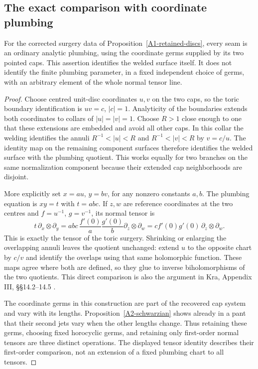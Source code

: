 \subsection{The exact comparison with coordinate plumbing}

\begin{proposition}\label{A1-welding-plumbing}
For the corrected surgery data of Proposition~\ref{A1-retained-discs}, every seam is an ordinary analytic plumbing, using the coordinate germs supplied by its two pointed caps. This assertion identifies the welded surface itself. It does not identify the finite plumbing parameter, in a fixed independent choice of germs, with an arbitrary element of the whole normal tensor line.
\end{proposition}
\begin{proof}
Choose centred unit-disc coordinates $u,v$ on the two caps, so the toric boundary identification is $uv=c$, $|c|=1$. Analyticity of the boundaries extends both coordinates to collars of $|u|=|v|=1$. Choose $R>1$ close enough to one that these extensions are embedded and avoid all other caps. In this collar the welding identifies the annuli $R^{-1}<|u|<R$ and $R^{-1}<|v|<R$ by $v=c/u$. The identity map on the remaining component surfaces therefore identifies the welded surface with the plumbing quotient. This works equally for two branches on the same normalization component because their extended cap neighborhoods are disjoint.

More explicitly set $x=a u$, $y=b v$, for any nonzero constants $a,b$. The plumbing equation is $xy=t$ with $t=ab c$. If $z,w$ are reference coordinates at the two centres and $f=u^{-1}$, $g=v^{-1}$, its normal tensor is
\[
 t\,\partial_x\otimes\partial_y
 =ab c\,\frac{f'(0)}a\frac{g'(0)}b
            \partial_z\otimes\partial_w
 =c f'(0)g'(0)\,\partial_z\otimes\partial_w.
\]
This is exactly the tensor of the toric surgery. Shrinking or enlarging the overlapping annuli leaves the quotient unchanged: extend $u$ to the opposite chart by $c/v$ and identify the overlaps using that same holomorphic function. These maps agree where both are defined, so they glue to inverse biholomorphisms of the two quotients. This direct comparison is also the argument in Kra, Appendix III, \S\S14.2--14.5 \cite{AKra1990}.

The coordinate germs in this construction are part of the recovered cap system and vary with its lengths. Proposition~\ref{A2-schwarzian} shows already in a pant that their second jets vary when the other lengths change. Thus retaining these germs, choosing fixed horocyclic germs, and retaining only first-order normal tensors are three distinct operations. The displayed tensor identity describes their first-order comparison, not an extension of a fixed plumbing chart to all tensors.
\end{proof}

